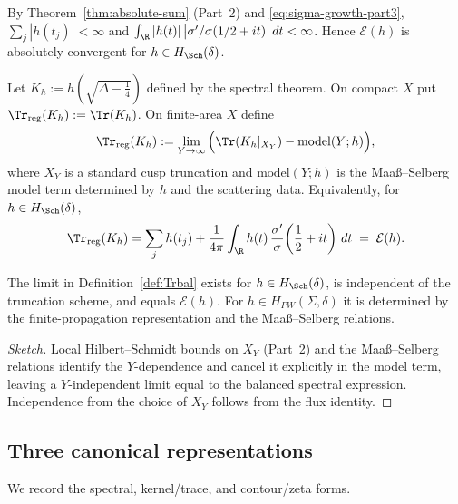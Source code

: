 \begin{remark}
\label{rem:Eh-abs}
By Theorem~\textup{\ref{thm:absolute-sum}} (Part~2) and \eqref{eq:sigma-growth-part3},
$\sum_j |h(t_j)|<\infty$ and $\int_{\R}|h(t)|\,\big|\sigma'/\sigma(1/2+it)\big|\,dt<\infty$.
Hence $\mathcal{E}(h)$ is absolutely convergent for $h\in H_{\Sch}(\delta)$.
\end{remark}

\begin{definition}
\label{def:Trbal}
Let $K_h:=h(\sqrt{\Delta-\tfrac14})$ defined by the spectral theorem. On compact $X$ put
$\Tr_{\mathrm{reg}}(K_h):=\Tr(K_h)$. On finite-area $X$ define
\[
  \Tr_{\mathrm{reg}}(K_h)
  := \lim_{Y\to\infty}\Big(\Tr(K_h|_{X_Y}) - \mathrm{model}(Y;h)\Big),
\]
where $X_Y$ is a standard cusp truncation and $\mathrm{model}(Y;h)$ is the Maaß–Selberg model
term determined by $h$ and the scattering data. Equivalently, for $h\in H_{\Sch}(\delta)$,
\[
  \Tr_{\mathrm{reg}}(K_h)
  = \sum_{j} h(t_j) + \frac{1}{4\pi}\int_{\R} h(t)\,
     \frac{\sigma'}{\sigma}\!\left(\frac12+it\right)\,dt
  \;=\; \mathcal{E}(h).
\]
\end{definition}

\begin{proposition}
\label{prop:Trreg-wellposed}
The limit in Definition~\textup{\ref{def:Trbal}} exists for $h\in H_{\Sch}(\delta)$, is independent
of the truncation scheme, and equals $\mathcal{E}(h)$. For $h\in H_{PW}(\Sigma,\delta)$ it is
determined by the finite-propagation representation and the Maaß–Selberg relations.
\end{proposition}

\begin{proof}[Sketch]
Local Hilbert–Schmidt bounds on $X_Y$ (Part~2) and the Maaß–Selberg relations identify the
$Y$-dependence and cancel it explicitly in the model term, leaving a $Y$-independent limit equal to the balanced spectral expression. Independence from the choice of $X_Y$ follows from the flux identity.
\end{proof}

\subsection{Three canonical representations}
\label{subsec:part3-three-forms}

We record the spectral, kernel/trace, and contour/zeta forms.

